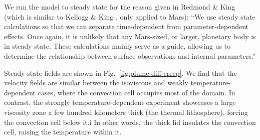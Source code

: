 We run the model to steady state for the reason given in Redmond \& King \cite{reki04} (which is similar to Kellogg \& King \cite{keki97}, only applied to Mars): ``We use steady state calculations so that we can separate time-dependent from parameter-dependent effects. Once again, it is unlikely that any Mars-sized, or larger, planetary body is in steady state. These calculations mainly serve as a guide, allowing us to determine the relationship between surface observations and internal parameters.''

Steady-state fields are shown in Fig.~\ref{fig:plume-diff-creep}. We find that the velocity fields are similar between the isoviscous and weakly temperature-dependent cases, where the convection cell occupies most of the domain. In contrast, the strongly temperature-dependent experiment showcases a large viscosity zone a few hundred kilometers thick (the thermal lithosphere), forcing the convection cell below it.i In other words, the thick lid insulates the convection cell, raising the temperature within it.

